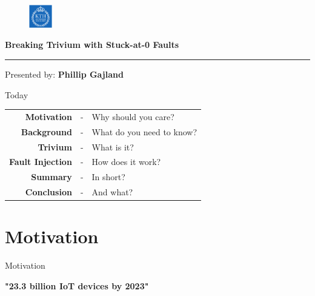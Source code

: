 \documentclass[10pt, compress]{beamer}
\begin{document}
\begin{frame}[plain,t]

\begin{figure}
\begin{flushright}
\vspace{-2cm}
\includegraphics[width = 10mm]{figures/kth_logo.png}
\end{flushright}
\end{figure}

\vspace{2cm}

{\large\textbf{Breaking Trivium with Stuck-at-0 Faults}}
\\\rule{7.5cm}{1pt}

\vspace{0.5cm}

{\large Presented by: \textbf{Phillip Gajland}}

\begin{figure}

\end{figure}
\end{frame}

\begin{frame}{Today}
\begin{table}
\def\arraystretch{1.2}
\raggedright
\begin{tabular}{r c l}
\textbf{Motivation} &-& Why should you care?\\
\textbf{Background} &-& What do you need to know?\\
\textbf{Trivium} &-& What is it?\\
\textbf{Fault Injection} &-& How does it work?\\
\textbf{Summary} &-& In short?\\
\textbf{Conclusion} &-& And what?
\end{tabular}
\end{table}
\end{frame}

\section{Motivation}

\begin{frame}{Motivation}
\vspace{1cm}
\begin{center}
\centering
{\LARGE\textbf{"23.3 billion IoT devices by 2023"}}\cite{iot}
\end{center}
\end{frame}
\end{document}
